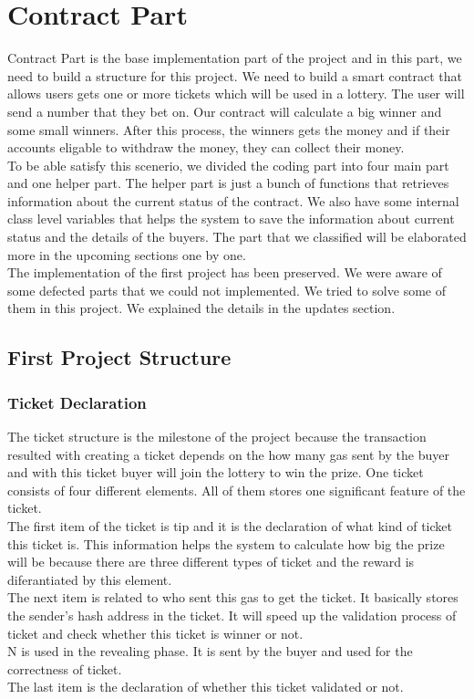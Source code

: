 \documentclass[]{scrreprt}
\begin{document}
	\chapter{Contract Part}
	Contract Part is the base implementation part of the project and in this part, we need to build a structure for this project. We need to build a smart contract that allows users gets one or more tickets which will be used in a lottery. The user will send a number that they bet on. Our contract will calculate a big winner and some small winners. After this process, the winners gets the money and if their accounts eligable to withdraw the money, they can collect their money.\\
	To be able satisfy this scenerio, we divided the coding part into four main part and one helper part. The helper part is just a bunch of functions that retrieves information about the current status of the contract. We also have some internal class level variables that helps the system to save the information about current status and the details of the buyers. The part that we classified will be elaborated more in the upcoming sections one by one. \\
	The implementation of the first project has been preserved. We were aware of some defected parts that we could not implemented. We tried to solve some of them in this project. We explained the details in the updates section.
	 \section{First Project Structure}
		\subsection{Ticket Declaration}
		The ticket structure is the milestone of the project because the transaction resulted with creating a ticket depends on the how many gas sent by the buyer and with this ticket buyer will join the lottery to win the prize. One ticket consists of four different elements. All of them stores one significant feature of the ticket.  \\
		The first item of the ticket is tip and it is the declaration of what kind of ticket this ticket is. This information helps the system to calculate how big the prize will be because there are three different types of ticket and the reward is diferantiated by this element. \\
		The next item is related to who sent this gas to get the ticket. It basically stores the sender's hash address in the ticket. It will speed up the validation process of ticket and check whether this ticket is winner or not.\\
		N is used in the revealing phase. It is sent by the buyer and used for the correctness of ticket. \\
		The last item is the declaration of whether this ticket validated or not.
\end{document}
